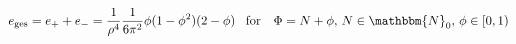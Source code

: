 \begin{equation}
e_{\text{ges}}=e_++e_-
=\frac{1}{\rho^4}\frac{1}{6\pi^2}\phi(1-\phi^2)(2-\phi)\, \ \
\text{for } \ \
\Phi=N+\phi,\,N\in\mathbbm{N}_0,\,\phi\in[0,1)
\label{energievortex}
\end{equation}

